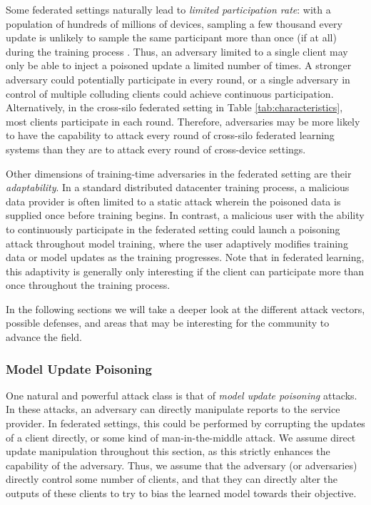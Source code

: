 \documentclass[11pt]{article}
\begin{document}
Some federated settings naturally lead to \emph{limited participation rate}: with a population of hundreds of millions of devices, sampling a few thousand every update is unlikely to sample the same participant more than once (if at all) during the training process \citep{bonawitz19sysml}. Thus, an adversary limited to a single client may only be able to inject a poisoned update a limited number of times. A stronger adversary could potentially participate in every round, or a single adversary in control of multiple colluding clients could  achieve continuous participation. Alternatively, in the cross-silo federated setting in Table \ref{tab:characteristics}, most clients participate in each round. Therefore, adversaries may be more likely to have the capability to attack every round of cross-silo federated learning systems than they are to attack every round of cross-device settings.

Other dimensions of training-time adversaries in the federated setting are their \emph{adaptability}. In a standard distributed datacenter training process, a malicious data provider is often limited to a static attack wherein the poisoned data is supplied once before training begins. In contrast, a malicious user with the ability to continuously participate in the federated setting could launch a poisoning attack throughout model training, where the user adaptively modifies training data or model updates as the training progresses. Note that in federated learning, this adaptivity is generally only interesting if the client can participate more than once throughout the training process.

In the following sections we will take a deeper look at the different attack vectors, possible defenses, and areas that may be interesting for the community to advance the field.

\subsubsection{Model Update Poisoning}
\label{subsubsec:model_poisoning}

One natural and powerful attack class is that of \emph{model update poisoning} attacks. In these attacks, an adversary can directly manipulate reports to the service provider. In federated settings, this could be performed by corrupting the updates of a client directly, or some kind of man-in-the-middle attack. We assume direct update manipulation throughout this section, as this strictly enhances the capability of the adversary. Thus, we assume that the adversary (or adversaries) directly control some number of clients, and that they can directly alter the outputs of these clients to try to bias the learned model towards their objective.
\end{document}
